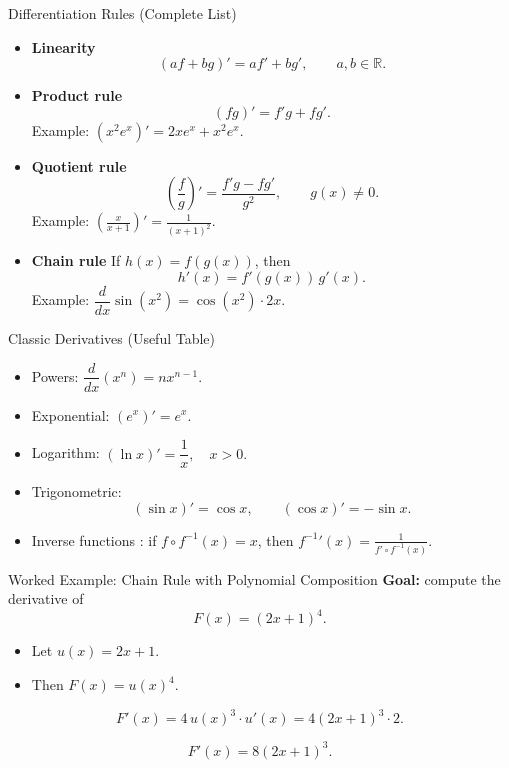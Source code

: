 \documentclass[aspectratio=169]{beamer}
\begin{document}
\begin{frame}{Differentiation Rules (Complete List)}
\begin{itemize}
    \item \textbf{Linearity}
    \[
    (af+bg)' = af' + bg', \qquad a,b\in\mathbb{R}.
    \]

    \item \textbf{Product rule}
    \[
    (fg)' = f'g + fg'.
    \]
    Example: \( (x^2 e^x)' = 2x e^x + x^2 e^x\).

    \item \textbf{Quotient rule}
    \[
    \left(\frac{f}{g}\right)' = 
    \frac{f'g - fg'}{g^2}, \qquad g(x)\neq 0.
    \]
    Example: \( \left(\frac{x}{x+1}\right)' = \frac{1}{(x+1)^2}. \)

    \item \textbf{Chain rule}
    If \(h(x)=f(g(x))\), then
    \[
    h'(x)=f'(g(x))\,g'(x).
    \]
    Example: \( \dfrac{d}{dx}\sin(x^2)=\cos(x^2)\cdot 2x.\)
\end{itemize}
\end{frame}

\begin{frame}{Classic Derivatives (Useful Table)}
\begin{itemize}
    \item Powers: \( \dfrac{d}{dx}(x^n)=n x^{n-1}\).
    \item Exponential: \( (e^x)' = e^x \).
    \item Logarithm: \( (\ln x)' = \dfrac{1}{x},\quad x>0.\)
    \item Trigonometric:
    \[
    (\sin x)'=\cos x,\qquad (\cos x)'=-\sin x.
    \]
    \item Inverse functions : if $ f \circ f^{-1} (x) = x$, then $ \left. f^{-1} \right.' (x) = \frac{1}{ f' \circ f^{-1}(x)}.$
\end{itemize}
\end{frame}

\begin{frame}{Worked Example: Chain Rule with Polynomial Composition}
\textbf{Goal:} compute the derivative of
\[
F(x)=(2x+1)^4.
\]

\begin{itemize}
    \item Let \(u(x)=2x+1\).
    \item Then \(F(x)=u(x)^4\).
\end{itemize}

\[
F'(x)=4\,u(x)^3\cdot u'(x)
     =4(2x+1)^3\cdot 2.
\]

\[
\boxed{F'(x)=8(2x+1)^3}.
\]
\end{frame}
\end{document}

